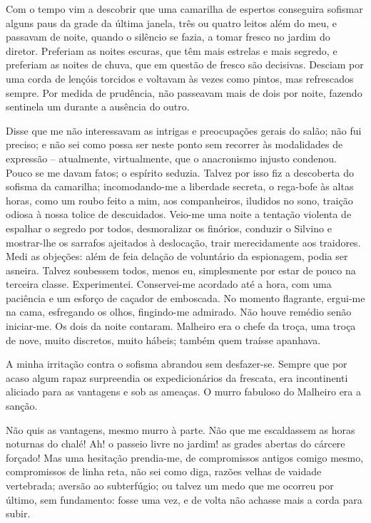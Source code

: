 Com o tempo vim a descobrir que uma camarilha de espertos conseguira
sofismar alguns paus da grade da última janela, três ou quatro leitos
além do meu, e passavam de noite, quando o silêncio se fazia, a tomar
fresco no jardim do diretor. Preferiam as noites escuras, que têm mais
estrelas e mais segredo, e preferiam as noites de chuva, que em questão
de fresco são decisivas. Desciam por uma corda de lençóis torcidos e
voltavam às vezes como pintos, mas refrescados sempre. Por medida de
prudência, não passeavam mais de dois por noite, fazendo sentinela um
durante a ausência do outro. 

Disse que me não interessavam as intrigas
e preocupações gerais do salão; não fui preciso; e não sei como possa
ser neste ponto sem recorrer às modalidades de expressão -- atualmente, 
virtualmente, que o anacronismo injusto condenou. Pouco se
me davam fatos; o espírito seduzia. Talvez por isso fiz a descoberta do
sofisma da camarilha; incomodando{}-me a liberdade secreta, o
rega{}-bofe às altas horas, como um roubo feito a mim, aos
companheiros, iludidos no sono, traição odiosa à nossa tolice de
descuidados. Veio{}-me uma noite a tentação violenta de espalhar o
segredo por todos, desmoralizar os finórios, conduzir o Silvino e
mostrar{}-lhe os sarrafos ajeitados à deslocação, trair merecidamente
aos traidores. Medi as objeções: além de feia delação de voluntário da
espionagem, podia ser asneira. Talvez soubessem todos, menos eu,
simplesmente por estar de pouco na terceira classe. Experimentei.
Conservei{}-me acordado até a hora, com uma paciência e um esforço de
caçador de emboscada. No momento flagrante, ergui{}-me na cama,
esfregando os olhos, fingindo{}-me admirado. Não houve remédio senão
iniciar{}-me. Os dois da noite contaram. Malheiro era o chefe da troça,
uma troça de nove, muito discretos, muito hábeis; também quem traísse
apanhava. 

A minha irritação contra o sofisma abrandou sem
desfazer{}-se. Sempre que por acaso algum rapaz surpreendia os
expedicionários da frescata, era incontinenti aliciado para as
vantagens e sob as ameaças. O murro fabuloso do Malheiro era a sanção.

Não quis as vantagens, mesmo murro à parte. Não que me escaldassem as
horas noturnas do chalé! Ah! o passeio livre no jardim! as grades
abertas do cárcere forçado! Mas uma hesitação prendia{}-me, de
compromissos antigos comigo mesmo, compromissos de linha reta, não sei
como diga, razões velhas de vaidade vertebrada; aversão ao subterfúgio;
ou talvez um medo que me ocorreu por último, sem fundamento: fosse uma
vez, e de volta não achasse mais a corda para subir. 

